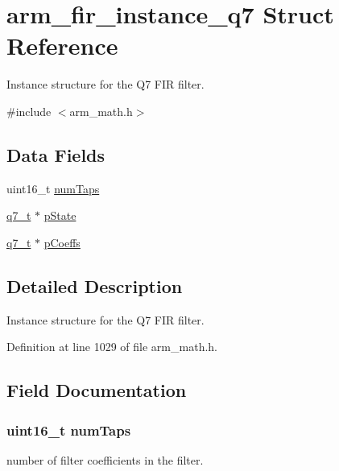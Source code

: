 \hypertarget{structarm__fir__instance__q7}{}\section{arm\+\_\+fir\+\_\+instance\+\_\+q7 Struct Reference}
\label{structarm__fir__instance__q7}


Instance structure for the Q7 F\+IR filter.  




{\ttfamily \#include $<$arm\+\_\+math.\+h$>$}

\subsection*{Data Fields}
\begin{DoxyCompactItemize}
\item 
uint16\+\_\+t \hyperlink{structarm__fir__instance__q7_a751941891e47f522a7f5375fe8990aac}{num\+Taps}
\item 
\hyperlink{arm__math_8h_ae541b6f232c305361e9b416fc9eed263}{q7\+\_\+t} $\ast$ \hyperlink{structarm__fir__instance__q7_aa8f67102521b620af6f259afdcf29785}{p\+State}
\item 
\hyperlink{arm__math_8h_ae541b6f232c305361e9b416fc9eed263}{q7\+\_\+t} $\ast$ \hyperlink{structarm__fir__instance__q7_a54407554b4fe7bbbb43924e4eea45e7f}{p\+Coeffs}
\end{DoxyCompactItemize}


\subsection{Detailed Description}
Instance structure for the Q7 F\+IR filter. 

Definition at line 1029 of file arm\+\_\+math.\+h.



\subsection{Field Documentation}
\subsubsection[{\texorpdfstring{num\+Taps}{numTaps}}]{\setlength{\rightskip}{0pt plus 5cm}uint16\+\_\+t num\+Taps}\hypertarget{structarm__fir__instance__q7_a751941891e47f522a7f5375fe8990aac}{}\label{structarm__fir__instance__q7_a751941891e47f522a7f5375fe8990aac}
number of filter coefficients in the filter. 

